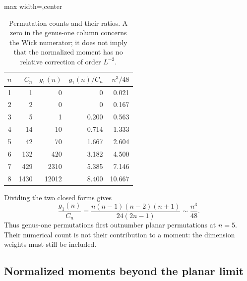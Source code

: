 \documentclass[11pt,letterpaper]{article}
\theoremstyle{plain}
\theoremstyle{definition}
\theoremstyle{remark}
\begin{document}
\begin{table}[htbp]
\centering
\caption{Permutation counts and their ratios.  A zero in the genus-one
column concerns the Wick numerator; it does not imply that the normalized
moment has no relative correction of order $L^{-2}$.}
\label{tab10:genus_one_values}
\begin{adjustbox}{max width=\textwidth,center}
\begin{tabular}{c r r r r}
\hline
$n$ & $C_n$ & $g_1(n)$ & $g_1(n)/C_n$ & $n^3/48$\\
\hline
1&1&0&0&0.021\\
2&2&0&0&0.167\\
3&5&1&0.200&0.563\\
4&14&10&0.714&1.333\\
5&42&70&1.667&2.604\\
6&132&420&3.182&4.500\\
7&429&2310&5.385&7.146\\
8&1430&12012&8.400&10.667\\
\hline
\end{tabular}
\end{adjustbox}
\end{table}

Dividing the two closed forms gives
\begin{equation}
 \frac{g_1(n)}{C_n}
 =\frac{n(n-1)(n-2)(n+1)}{24(2n-1)}
 \sim\frac{n^3}{48}.
 \label{eq10:genus_ratio}
\end{equation}
Thus genus-one permutations first outnumber planar permutations at $n=5$.
Their numerical count is not their contribution to a moment: the dimension
weights must still be included.

\subsection{Normalized moments beyond the planar limit}
\label{subsec10:higher_genus}
\end{document}
